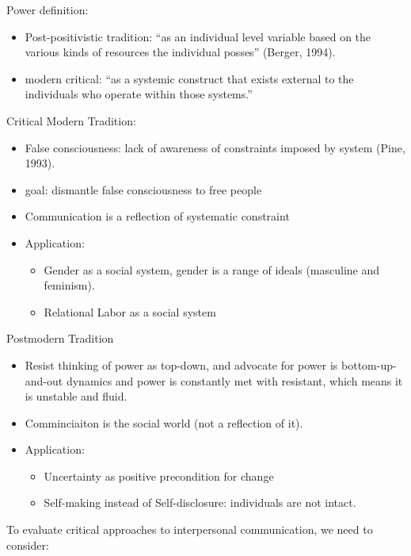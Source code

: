 \documentclass[
]{book}
\providecommand{\tightlist}{%
  \setlength{\itemsep}{0pt}\setlength{\parskip}{0pt}}
\begin{document}
Power definition:

\begin{itemize}
\tightlist
\item
  Post-positivistic tradition: ``as an individual level variable based on the various kinds of resources the individual
  posses'' (Berger, 1994).
\item
  modern critical: ``as a systemic construct that exists external to the individuals who operate within those systems.''
  \citep[pp.~273]{Baxter_2008}
\end{itemize}

Critical Modern Tradition:

\begin{itemize}
\item
  False consciousness: lack of awareness of constraints imposed by system (Pine, 1993).
\item
  goal: dismantle false consciousness to free people
\item
  Communication is a reflection of systematic constraint
\item
  Application:

  \begin{itemize}
  \item
    Gender as a social system, gender is a range of ideals (masculine and feminism).
  \item
    Relational Labor as a social system
  \end{itemize}
\end{itemize}

Postmodern Tradition

\begin{itemize}
\item
  Resist thinking of power as top-down, and advocate for power is bottom-up-and-out dynamics and power is constantly
  met with resistant, which means it is unstable and fluid.
\item
  Comminciaiton is the social world (not a reflection of it).
\item
  Application:

  \begin{itemize}
  \item
    Uncertainty as positive precondition for change
  \item
    Self-making instead of Self-disclosure: individuals are not intact.
  \end{itemize}
\end{itemize}

To evaluate critical approaches to interpersonal communication, we need to consider:
\end{document}
